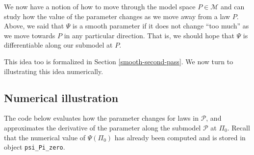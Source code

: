 \documentclass[11pt,openright,twoside]{book}
\newcommand{\calM}{\mathcal{M}}
\newcommand{\calP}{\mathcal{P}}
\theoremstyle{definition}
\theoremstyle{definition}
\theoremstyle{definition}
\theoremstyle{remark}
\begin{document}
We now have a notion of how to move through the model space \(P \in \calM\) and
can study how the value of the parameter changes as we move away from a law
\(P\). Above, we said that \(\Psi\) is a smooth parameter if it does not change
``too much'' as we move towards \(P\) in any particular direction. That is, we
should hope that \(\Psi\) is differentiable along our submodel at \(P\).

This idea too is formalized in Section \ref{smooth-second-pass}. We now turn
to illustrating this idea numerically.

\hypertarget{numerical-illus}{%
\subsection{Numerical illustration}\label{numerical-illus}}

The code below evaluates how the parameter changes for laws in \(\calP\), and
approximates the derivative of the parameter along the submodel \(\calP\) at
\(\Pi_0\). Recall that the numerical value of \(\Psi(\Pi_{0})\) has already been
computed and is stored in object \texttt{psi\_Pi\_zero}.
\end{document}
